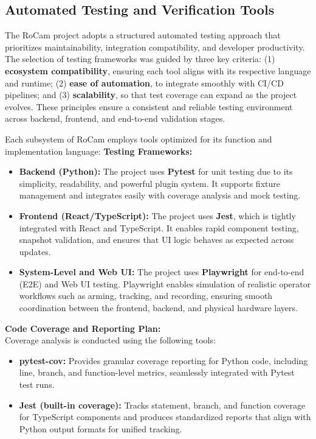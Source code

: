 \documentclass[12pt, titlepage]{article}
\begin{document}
\subsection{Automated Testing and Verification Tools}

The RoCam project adopts a structured automated testing approach that
prioritizes maintainability, integration compatibility, and developer
productivity. The selection of testing frameworks was guided by three key
criteria: (1) \textbf{ecosystem compatibility}, ensuring each tool aligns with
its respective language and runtime; (2) \textbf{ease of automation}, to
integrate smoothly with CI/CD pipelines; and (3) \textbf{scalability}, so that
test coverage can expand as the project evolves. These principles ensure a
consistent and reliable testing environment across backend, frontend, and
end-to-end validation stages.

Each subsystem of RoCam employs tools optimized for its function and
implementation language: \textbf{Testing Frameworks:} \\
\begin{itemize}
  \item \textbf{Backend (Python):} The project uses \textbf{Pytest} for unit testing due
        to its simplicity, readability, and powerful plugin system. It supports fixture
        management and integrates easily with coverage analysis and mock testing.
  \item \textbf{Frontend (React/TypeScript):} The project uses \textbf{Jest}, which is
        tightly integrated with React and TypeScript. It enables rapid component testing,
        snapshot validation, and ensures that UI logic behaves as expected across updates.
  \item \textbf{System-Level and Web UI:} The project uses \textbf{Playwright} for
        end-to-end (E2E) and Web UI testing. Playwright enables simulation of realistic
        operator workflows such as arming, tracking, and recording, ensuring smooth
        coordination between the frontend, backend, and physical hardware layers.
\end{itemize}

\textbf{Code Coverage and Reporting Plan:} \\
Coverage analysis is conducted using the following tools:
\begin{itemize}
  \item \textbf{pytest-cov:} Provides granular coverage reporting for Python code,
        including line, branch, and function-level metrics, seamlessly integrated with
        Pytest test runs.
  \item \textbf{Jest (built-in coverage):} Tracks statement, branch, and function coverage
        for TypeScript components and produces standardized reports that align with Python
        output formats for unified tracking.
\end{itemize}
\end{document}
